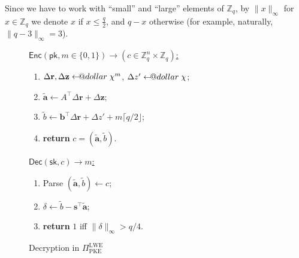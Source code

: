 \documentclass{template}
\makeatletter
\newcommand\leftarrowS{\leftarrow\joinrel\smalldollar}
\newcommand{\smalldollar}{\mathrel{\mathpalette\small@dollar\relax}}
\newcommand{\small@dollar}[2]{%
  \vcenter{\hbox{%
    $#1\textnormal{\fontsize{0.7\dimexpr\f@size pt}{0}\selectfont\$}$%
  }}%
}
\makeatother
\begin{document}
Since we have to work with ``small'' and ``large'' elements of $\mathbb{Z}_q$,
by $\|x\|_{\infty}$ for $x \in \mathbb{Z}_q$ we denote $x$ if $x \leq \frac{q}{2}$, and
$q-x$ otherwise (for example, naturally, $\|q-3\|_{\infty} = 3$).

\begin{figure}[ht]
    \centering
    \begin{minipage}{0.45\linewidth}
        \begin{mdframed}[linecolor=black, linewidth=1pt,
                         skipabove=10pt, skipbelow=10pt]
        \colorbox{green!10}{\underline{$\mathsf{Enc}(\mathsf{pk}, m \in \{0,1\}) \to (c \in \mathbb{Z}_q^n \times \mathbb{Z}_q)$:}}
        \begin{enumerate}
            \item $\Delta\mathbf{r}, \Delta\mathbf{z} \leftarrowS \chi^m$, $\Delta z' \leftarrowS \chi$;
            \item $\widetilde{\mathbf{a}} \gets A^{\top}\Delta\mathbf{r} + \Delta\mathbf{z}$;
            \item $\widetilde{b} \gets \mathbf{b}^{\top}\Delta\mathbf{r}  + \Delta z' + m\lceil q/2 \rfloor$;
            \item \textbf{return} $c=(\widetilde{\mathbf{a}}, \widetilde{b})$.
        \end{enumerate}
        \end{mdframed}
        \caption{Encryption in $\Pi_{\text{PKE}}^{\text{LWE}}$} 
        \label{fig:lwe-enc}
    \end{minipage}
    \hfill
    \begin{minipage}{0.45\linewidth}
        \begin{mdframed}[linecolor=black, linewidth=1pt,
                         skipabove=10pt, skipbelow=10pt]
        \colorbox{green!10}{\underline{$\mathsf{Dec}(\mathsf{sk}, c) \to m$:}}
        \begin{enumerate}
            \item Parse $(\widetilde{\mathbf{a}}, \widetilde{b}) \gets c$;
            \item $\delta \gets \widetilde{b} - \mathbf{s}^{\top}\widetilde{\mathbf{a}}$;
            \item \textbf{return} $1$ iff $\|\delta\|_{\infty} > q/4$.
        \end{enumerate}
        \end{mdframed}
        \caption{Decryption in $\Pi_{\text{PKE}}^{\text{LWE}}$}
        \label{fig:lwe-dec}
    \end{minipage}
\end{figure}
\end{document}
